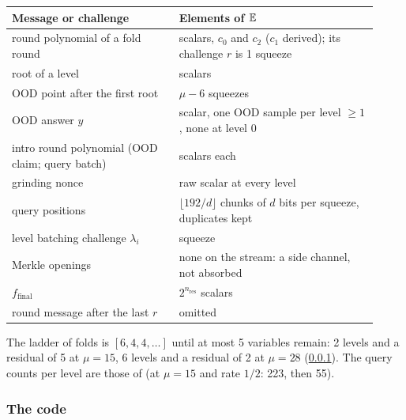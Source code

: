 \begin{center}\small
\begin{tabular}{@{}>{\raggedright\arraybackslash}p{0.42\linewidth}>{\raggedright\arraybackslash}p{0.5\linewidth}@{}}
\toprule
Message or challenge & Elements of $\mathbb{E}$ \\
\midrule
round polynomial of a fold round & 2 scalars, $c_0$ and $c_2$ ($c_1$ derived); its challenge $r$ is
  1 squeeze \\
root of a level & 2 scalars \\
OOD point after the first root & $μ − 6$ squeezes \\
OOD answer $y$ & 1 scalar, one OOD sample per level $≥ 1$, none at level 0 \\
intro round polynomial (OOD claim; query batch) & 2 scalars each \\
grinding nonce & 1 raw scalar at every level \\
query positions & $⌊192/d⌋$ chunks of $d$ bits per squeeze, duplicates kept \\
level batching challenge $λ_i$ & 1 squeeze \\
Merkle openings & none on the stream: a side channel, not absorbed \\
$f_{\mathrm{final}}$ & $2^{n_{\mathrm{res}}}$ scalars \\
round message after the last $r$ & omitted \\
\bottomrule
\end{tabular}
\end{center}

The ladder of folds is $[6, 4, 4, …]$ until at most 5 variables remain: 2 levels and a residual of
5 at $μ = 15$, 6 levels and a residual of 2 at $μ = 28$ (\cref{sec:gen-opening-code}). The query
counts per level are those of  (at $μ = 15$ and rate $1/2$: 223, then 55).

\subsubsection{The code}\label{sec:gen-opening-code}

